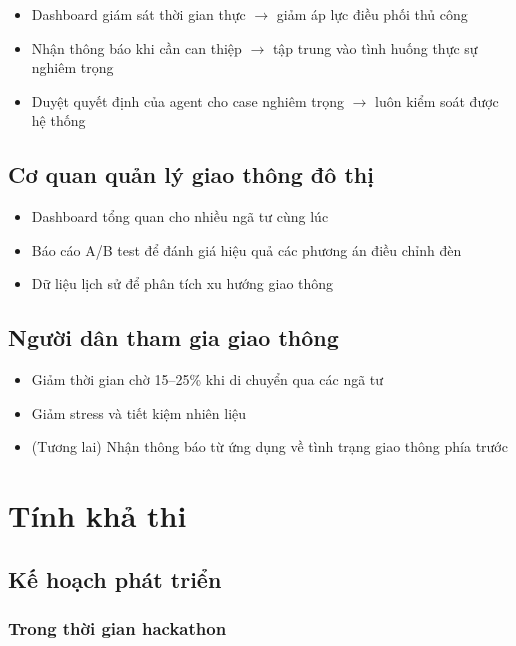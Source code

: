 \documentclass[12pt,a4paper]{article}
\begin{document}
\begin{itemize}
    \item Dashboard giám sát thời gian thực $\rightarrow$ giảm áp lực điều phối thủ công
    \item Nhận thông báo khi cần can thiệp $\rightarrow$ tập trung vào tình huống thực sự nghiêm trọng
    \item Duyệt quyết định của agent cho case nghiêm trọng $\rightarrow$ luôn kiểm soát được hệ thống
\end{itemize}

\subsection{Cơ quan quản lý giao thông đô thị}

\begin{itemize}
    \item Dashboard tổng quan cho nhiều ngã tư cùng lúc
    \item Báo cáo A/B test để đánh giá hiệu quả các phương án điều chỉnh đèn
    \item Dữ liệu lịch sử để phân tích xu hướng giao thông
\end{itemize}

\subsection{Người dân tham gia giao thông}

\begin{itemize}
    \item Giảm thời gian chờ 15--25\% khi di chuyển qua các ngã tư
    \item Giảm stress và tiết kiệm nhiên liệu
    \item (Tương lai) Nhận thông báo từ ứng dụng về tình trạng giao thông phía trước
\end{itemize}

\section{Tính khả thi}

\subsection{Kế hoạch phát triển}

\subsubsection{Trong thời gian hackathon}
\end{document}
